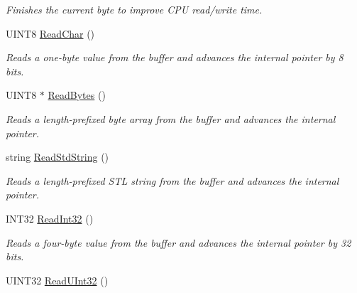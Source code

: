 \begin{DoxyCompactItemize}
\begin{DoxyCompactList}\small\item\em Finishes the current byte to improve C\-P\-U read/write time. \end{DoxyCompactList}\item 
\hypertarget{class_rhesus_1_1_messenger_1_1_net_buffer_a774cf83e844eeac761d56419fb57a03e}{U\-I\-N\-T8 \hyperlink{class_rhesus_1_1_messenger_1_1_net_buffer_a774cf83e844eeac761d56419fb57a03e}{Read\-Char} ()}\label{class_rhesus_1_1_messenger_1_1_net_buffer_a774cf83e844eeac761d56419fb57a03e}

\begin{DoxyCompactList}\small\item\em Reads a one-\/byte value from the buffer and advances the internal pointer by 8 bits. \end{DoxyCompactList}\item 
\hypertarget{class_rhesus_1_1_messenger_1_1_net_buffer_a5ae0249e846fae97674597d3b43f92ce}{U\-I\-N\-T8 $\ast$ \hyperlink{class_rhesus_1_1_messenger_1_1_net_buffer_a5ae0249e846fae97674597d3b43f92ce}{Read\-Bytes} ()}\label{class_rhesus_1_1_messenger_1_1_net_buffer_a5ae0249e846fae97674597d3b43f92ce}

\begin{DoxyCompactList}\small\item\em Reads a length-\/prefixed byte array from the buffer and advances the internal pointer. \end{DoxyCompactList}\item 
\hypertarget{class_rhesus_1_1_messenger_1_1_net_buffer_a2cd79cb9c3c746b57b0f7d9f5ac64ca6}{string \hyperlink{class_rhesus_1_1_messenger_1_1_net_buffer_a2cd79cb9c3c746b57b0f7d9f5ac64ca6}{Read\-Std\-String} ()}\label{class_rhesus_1_1_messenger_1_1_net_buffer_a2cd79cb9c3c746b57b0f7d9f5ac64ca6}

\begin{DoxyCompactList}\small\item\em Reads a length-\/prefixed S\-T\-L string from the buffer and advances the internal pointer. \end{DoxyCompactList}\item 
\hypertarget{class_rhesus_1_1_messenger_1_1_net_buffer_a9eec38fcaaa533abe3ebf308c1428f72}{I\-N\-T32 \hyperlink{class_rhesus_1_1_messenger_1_1_net_buffer_a9eec38fcaaa533abe3ebf308c1428f72}{Read\-Int32} ()}\label{class_rhesus_1_1_messenger_1_1_net_buffer_a9eec38fcaaa533abe3ebf308c1428f72}

\begin{DoxyCompactList}\small\item\em Reads a four-\/byte value from the buffer and advances the internal pointer by 32 bits. \end{DoxyCompactList}\item 
\hypertarget{class_rhesus_1_1_messenger_1_1_net_buffer_ae997bea8f104f6ac4f7d49ae4a5570f9}{U\-I\-N\-T32 \hyperlink{class_rhesus_1_1_messenger_1_1_net_buffer_ae997bea8f104f6ac4f7d49ae4a5570f9}{Read\-U\-Int32} ()}\label{class_rhesus_1_1_messenger_1_1_net_buffer_ae997bea8f104f6ac4f7d49ae4a5570f9}


\end{DoxyCompactItemize}

